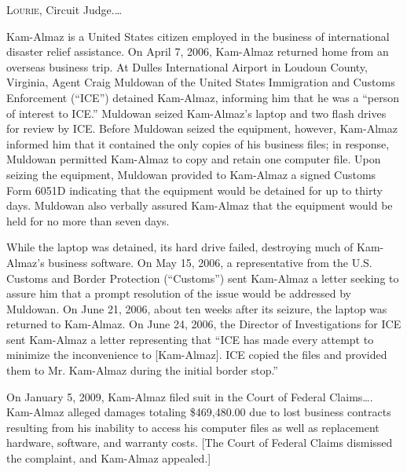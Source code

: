 
\opinion \textsc{Lourie}, Circuit Judge.\ldots

%
%
%
%
Kam-Almaz is a United States citizen employed in the
business of international disaster relief assistance. On April 7, 2006,
Kam-Almaz returned home from an overseas business trip. At Dulles International
Airport in Loudoun County, Virginia, Agent Craig Muldowan of the United States
Immigration and Customs Enforcement (``ICE'') detained Kam-Almaz, informing him
that he was a ``person of interest to ICE.'' Muldowan seized
Kam-Almaz's laptop and two flash drives for review by ICE. Before Muldowan
seized the equipment, however, Kam-Almaz informed him that it contained the only
copies of his business files; in response, Muldowan permitted Kam-Almaz to copy
and retain one computer file. Upon seizing the equipment, Muldowan provided to
Kam-Almaz a signed Customs Form 6051D indicating that the equipment would be
detained for up to thirty days. Muldowan also verbally assured Kam-Almaz that
the equipment would be held for no more than seven days.

While the laptop was detained, its hard drive failed, destroying much of
Kam-Almaz's business software. On May 15, 2006, a representative from the U.S.
Customs and Border Protection (``Customs'') sent Kam-Almaz a letter seeking to
assure him that a prompt resolution of the issue would be addressed by Muldowan.
On June 21, 2006, about ten weeks after its seizure, the laptop was returned to
Kam-Almaz. On June 24, 2006, the Director of Investigations for ICE sent
Kam-Almaz a letter representing that ``ICE has made  every attempt to minimize
the inconvenience to [Kam-Almaz]. ICE copied the files and provided them to Mr.
Kam-Almaz during the initial border stop.''

On January 5, 2009, Kam-Almaz filed suit in the Court of Federal Claims\ldots.
Kam-Almaz alleged damages totaling
\$469,480.00 due to lost business contracts resulting from his inability to
access his computer files as well as replacement hardware, software, and
warranty costs. [The Court of Federal Claims dismissed the complaint, and
Kam-Almaz appealed.]

